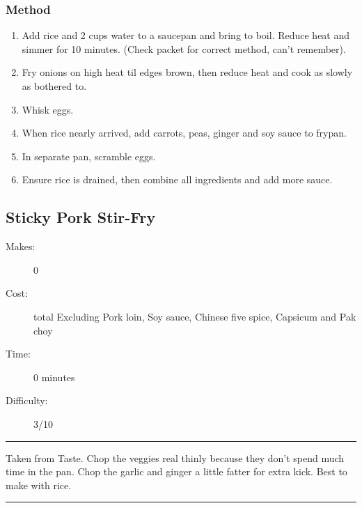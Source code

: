 \documentclass[]{article}
\begin{document}
\subsubsection*{\Large Method}
\begin{enumerate}[font=\huge\color{accent}]
	\item Add rice and 2 cups water to a saucepan and bring to boil. Reduce heat and simmer for 10 minutes. (Check packet for correct method, can't remember).
	\item Fry onions on high heat til edges brown, then reduce heat and cook as slowly as bothered to.
	\item Whisk eggs.
	\item When rice nearly arrived, add carrots, peas, ginger and soy sauce to frypan.
	\item In separate pan, scramble eggs.
	\item Ensure rice is drained, then combine all ingredients and add more sauce.
\end{enumerate}
\newpage
{}\label{rec:Sticky Pork Stir-Fry}
\subsection*{\center\huge Sticky Pork Stir-Fry}
\begin{description}
\item[Makes:] 0 
\item[Cost:]  total Excluding Pork loin, Soy sauce, Chinese five spice, Capsicum and Pak choy
\item[Time:] 0 minutes
\item[Difficulty:] 3/10
\end{description}
\vspace{0.2cm}\hrule\vspace{0.5cm}
\begin{adjustwidth}{0.5 cm}{0.5 cm}

Taken from Taste. Chop the veggies real thinly because they don’t spend much time in the pan. Chop the garlic and ginger a little fatter for extra kick. Best to make with rice. \hfill\color{accent}{\Large\faGlide\hspace{0.1cm}\faTruck\hspace{0.1cm}}\color{black}

\end{adjustwidth}
\vspace{0.5cm}\hrule
\end{document}
